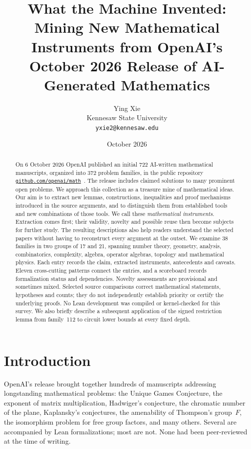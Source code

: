 \documentclass[11pt]{article}
\title{What the Machine Invented:\\[2pt]
\large Mining New Mathematical Instruments from OpenAI's October 2026 Release of AI-Generated Mathematics}
\author{Ying Xie\\Kennesaw State University\\\texttt{yxie2@kennesaw.edu}}
\date{October 2026}
\begin{document}
\maketitle

\begin{abstract}
On 6 October 2026 OpenAI published an initial 722 AI-written mathematical manuscripts, organized into 372 problem families, in the public repository \href{https://github.com/openai/math}{\texttt{github.com/openai/math}}~\cite{src:repo}. The release includes claimed solutions to many prominent open problems. We approach this collection as a treasure mine of mathematical ideas. Our aim is to extract new lemmas, constructions, inequalities and proof mechanisms introduced in the source arguments, and to distinguish them from established tools and new combinations of those tools. We call these \emph{mathematical instruments}. Extraction comes first; their validity, novelty and possible reuse then become subjects for further study. The resulting descriptions also help readers understand the selected papers without having to reconstruct every argument at the outset.
We examine 38 families in two groups of 17 and 21, spanning number theory, geometry, analysis, combinatorics, complexity, algebra, operator algebras, topology and mathematical physics. Each entry records the claim, extracted instruments, antecedents and caveats. Eleven cross-cutting patterns connect the entries, and a scoreboard records formalization status and dependencies. Novelty assessments are provisional and sometimes mixed. Selected source comparisons correct mathematical statements, hypotheses and counts; they do not independently establish priority or certify the underlying proofs. No Lean development was compiled or kernel-checked for this survey.
We also briefly describe a subsequent application of the signed restriction lemma from family~112 to circuit lower bounds at every fixed depth.
\end{abstract}

\tableofcontents
\bigskip

\section{Introduction}\label{sec:intro}

OpenAI's release brought together hundreds of manuscripts addressing longstanding mathematical problems: the Unique Games Conjecture, the exponent of matrix multiplication, Hadwiger's conjecture, the chromatic number of the plane, Kaplansky's conjectures, the amenability of Thompson's group~$F$, the isomorphism problem for free group factors, and many others. Several are accompanied by Lean formalizations; most are not. None had been peer-reviewed at the time of writing.
\end{document}
